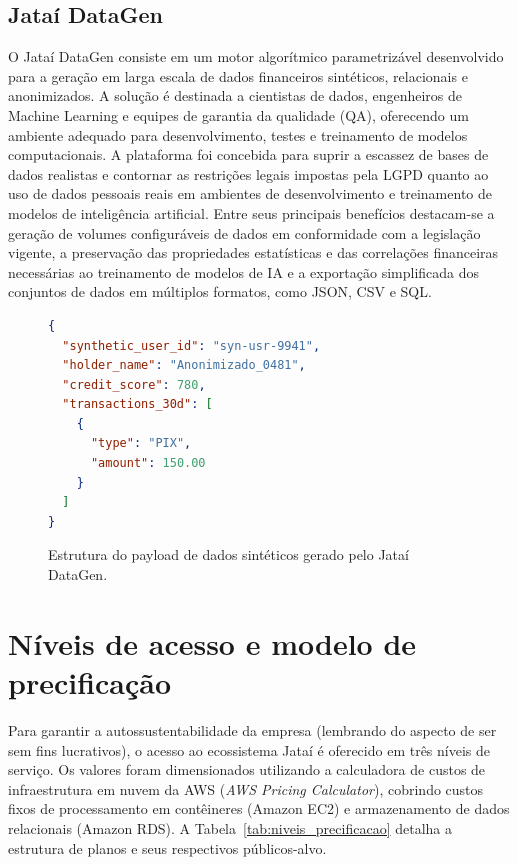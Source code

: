 \documentclass[
  12pt,
  openright,
  oneside,
  a4paper,
  brazilian
]{abntex2}
\begin{document}
\subsection{Jataí DataGen}
\label{subsec:jatai_datagen}

O Jataí DataGen consiste em um motor algorítmico parametrizável desenvolvido para a geração em larga escala de dados financeiros sintéticos, relacionais e anonimizados. A solução é destinada a cientistas de dados, engenheiros de Machine Learning e equipes de garantia da qualidade (QA), oferecendo um ambiente adequado para desenvolvimento, testes e treinamento de modelos computacionais. A plataforma foi concebida para suprir a escassez de bases de dados realistas e contornar as restrições legais impostas pela LGPD quanto ao uso de dados pessoais reais em ambientes de desenvolvimento e treinamento de modelos de inteligência artificial. Entre seus principais benefícios destacam-se a geração de volumes configuráveis de dados em conformidade com a legislação vigente, a preservação das propriedades estatísticas e das correlações financeiras necessárias ao treinamento de modelos de IA e a exportação simplificada dos conjuntos de dados em múltiplos formatos, como JSON, CSV e SQL.

\begin{figure}[htbp]
\centering
\caption{Estrutura do payload de dados sintéticos gerado pelo Jataí DataGen.}
\label{fig:jatai_datagen}

\begin{minipage}{0.85\textwidth}
\begin{lstlisting}[language=json, caption={Exemplo de Payload Sintético Anonimizado (Conformidade LGPD)}]
{
  "synthetic_user_id": "syn-usr-9941",
  "holder_name": "Anonimizado_0481",
  "credit_score": 780,
  "transactions_30d": [
    {
      "type": "PIX",
      "amount": 150.00
    }
  ]
}
\end{lstlisting}
\end{minipage}

\end{figure}

\section{Níveis de acesso e modelo de precificação}
\label{sec:niveis_precificacao}

Para garantir a autossustentabilidade da empresa (lembrando do aspecto de ser sem fins lucrativos), o acesso ao ecossistema Jataí é oferecido em três níveis de serviço. Os valores foram dimensionados utilizando a calculadora de custos de infraestrutura em nuvem da AWS (\textit{AWS Pricing Calculator}), cobrindo custos fixos de processamento em contêineres (Amazon EC2) e armazenamento de dados relacionais (Amazon RDS). A Tabela~\ref{tab:niveis_precificacao} detalha a estrutura de planos e seus respectivos públicos-alvo.
\end{document}
